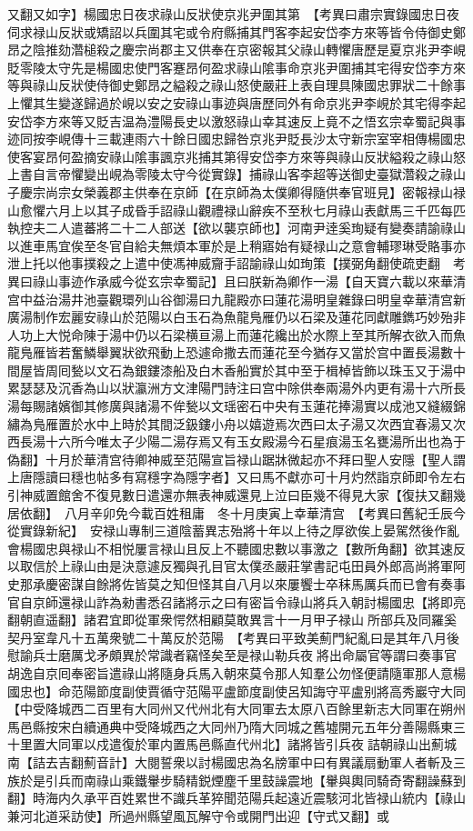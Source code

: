 又翻又如字】楊國忠日夜求祿山反狀使京兆尹圍其第　【考異曰肅宗實錄國忠日夜伺求禄山反狀或矯詔以兵圍其宅或令府縣捕其門客李起安岱李方來等皆令侍御史鄭昂之陰推劾濳槌殺之慶宗尚郡主又供奉在京密報其父祿山轉懼唐歷是夏京兆尹李峴貶零陵太守先是楊國忠使門客蹇昂何盈求祿山隂事命京兆尹圍捕其宅得安岱李方來等與祿山反狀使侍御史鄭昂之縊殺之祿山怒使嚴莊上表自理具陳國忠罪狀二十餘事上懼其生變遂歸過於峴以安之安祿山事迹與唐歷同外有命京兆尹李峴於其宅得李起安岱李方來等又貶吉温為澧陽長史以激怒祿山幸其速反上竟不之悟玄宗幸蜀記與事迹同按李峴傳十三載連雨六十餘日國忠歸咎京兆尹貶長沙太守新宗室宰相傳楊國忠使客宴昂何盈摘安祿山隂事諷京兆捕其第得安岱李方來等與祿山反狀縊殺之祿山怒上書自言帝懼變出峴為零陵太守今從實錄】捕祿山客李超等送御史臺獄濳殺之祿山子慶宗尚宗女榮義郡主供奉在京師【在京師為太僕卿得隨供奉官班見】密報禄山禄山愈懼六月上以其子成昏手詔祿山觀禮禄山辭疾不至秋七月祿山表獻馬三千匹每匹執控夫二人遣蕃將二十二人部送【欲以襲京師也】河南尹逹奚珣疑有變奏請諭祿山以進車馬宜俟至冬官自給夫無煩本軍於是上稍寤始有疑禄山之意會輔璆琳受賂事亦泄上托以他事撲殺之上遣中使馮神威齎手詔諭祿山如珣策【撲弼角翻使疏吏翻　考異曰祿山事迹作承威今從玄宗幸蜀記】且曰朕新為卿作一湯【自天寶六載以來華清宫中益治湯井池臺觀環列山谷御湯曰九龍殿亦曰蓮花湯明皇雜錄曰明皇幸華清宫新廣湯制作宏麗安祿山於范陽以白玉石為魚龍鳬雁仍以石梁及蓮花同獻雕鐫巧妙殆非人功上大悦命陳于湯中仍以石梁横亘湯上而蓮花纔出於水際上至其所解衣欲入而魚龍鳬雁皆若奮鱗舉翼狀欲飛動上恐遽命撒去而蓮花至今猶存又當於宫中置長湯數十間屋皆周囘甃以文石為銀鏤漆船及白木香船實於其中至于楫棹皆飾以珠玉又于湯中累瑟瑟及沉香為山以狀瀛洲方文津陽門詩注曰宫中除供奉兩湯外内更有湯十六所長湯每賜諸嬪御其修廣與諸湯不侔甃以文瑶密石中央有玉蓮花捧湯實以成池又縫綴錦繡為鳬雁置於水中上時於其間泛鈒鏤小舟以嬉遊焉次西曰太子湯又次西宜春湯又次西長湯十六所今唯太子少陽二湯存焉又有玉女殿湯今石星痕湯玉名甕湯所出也為于偽翻】十月於華清宫待卿神威至范陽宣旨禄山踞牀微起亦不拜曰聖人安隱【聖人謂上唐隱讀曰穩也帖多有寫穩字為隱字者】又曰馬不獻亦可十月灼然詣京師即令左右引神威置館舍不復見數日遣還亦無表神威還見上泣曰臣幾不得見大家【復扶又翻幾居依翻】　八月辛卯免今載百姓租庸　冬十月庚寅上幸華清宫　【考異曰舊紀壬辰今從實錄新紀】　安禄山專制三道陰蓄異志殆將十年以上待之厚欲俟上晏駕然後作亂會楊國忠與禄山不相悦屢言禄山且反上不聽國忠數以事激之【數所角翻】欲其速反以取信於上祿山由是決意遽反獨與孔目官太僕丞嚴莊掌書記屯田員外郎高尚將軍阿史那承慶密謀自餘將佐皆莫之知但怪其自八月以來屢饗士卒秣馬厲兵而已會有奏事官自京師還禄山詐為勑書悉召諸將示之曰有密旨令祿山將兵入朝討楊國忠【將即亮翻朝直遥翻】諸君宜即從軍衆愕然相顧莫敢異言十一月甲子禄山所部兵及同羅奚契丹室韋凡十五萬衆號二十萬反於范陽　【考異曰平致美薊門紀亂曰是其年八月後慰諭兵士磨厲戈矛頗異於常識者竊怪矣至是禄山勒兵夜將出命屬官等謂曰奏事官胡逸自京囘奉密旨遣祿山將隨身兵馬入朝來莫令那人知羣公勿怪便請隨軍那人意楊國忠也】命范陽節度副使賈循守范陽平盧節度副使呂知誨守平盧别將高秀巖守大同【中受降城西二百里有大同州又代州北有大同軍去太原八百餘里新志大同軍在朔州馬邑縣按宋白續通典中受降城西之大同州乃隋大同城之舊墟開元五年分善陽縣東三十里置大同軍以戍遣復於軍内置馬邑縣直代州北】諸將皆引兵夜詰朝祿山出薊城南【詰去吉翻薊音計】大閱誓衆以討楊國忠為名牓軍中曰有異議扇動軍人者斬及三族於是引兵而南祿山乘鐵轝步騎精鋭煙塵千里鼓譟震地【轝與輿同騎奇寄翻譟蘇到翻】時海内久承平百姓累世不識兵革猝聞范陽兵起遠近震駭河北皆禄山統内【祿山兼河北道采訪使】所過州縣望風瓦解守令或開門出迎【守式又翻】或